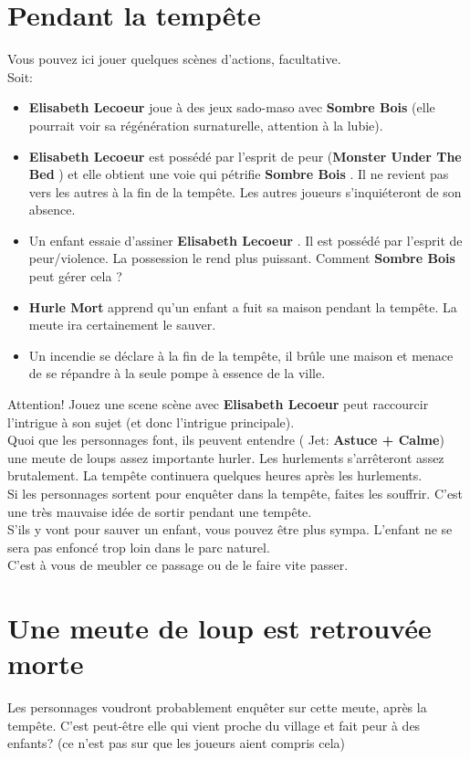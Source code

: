 \documentclass[oneside,12pt]{book}
\newcommand\roll[1]{
( Jet: \textbf{#1})
}
\newcommand{\Peter}{\textbf{Hurle Mort} }
\newcommand{\Leonard}{\textbf{Sombre Bois} }
\newcommand{\Monster}{\textbf{Monster Under The Bed} }
\newcommand{\Elisabeth}{\textbf{Elisabeth Lecoeur} }
\begin{document}
\begin{flushleft}
\section{Pendant la tempête}
Vous pouvez ici jouer quelques scènes d'actions, facultative.\\
Soit:\\ 
\begin{itemize}
\item  \Elisabeth joue à des jeux sado-maso avec \Leonard (elle pourrait voir sa régénération surnaturelle, attention à la lubie).
\item \Elisabeth est possédé par l'esprit de peur (\Monster) et elle obtient une voie qui pétrifie \Leonard. Il ne revient pas vers les autres à la fin de la tempête. Les autres joueurs s'inquiéteront de son absence.
\item Un enfant essaie d'assiner \Elisabeth . Il est possédé par l'esprit de peur/violence. La possession le rend plus puissant. Comment \Leonard peut gérer cela ?
\item \Peter apprend qu'un enfant a fuit sa maison pendant la tempête. La meute ira certainement le sauver.
\item Un incendie se déclare à la fin de la tempête, il brûle une maison et menace de se répandre à la seule pompe à essence de la ville. 
\end{itemize}
Attention! Jouez une scene scène avec \Elisabeth peut raccourcir l'intrigue à son sujet (et donc l'intrigue principale).\\

Quoi que les personnages font, ils peuvent entendre \roll{Astuce + Calme} une meute de loups assez importante hurler. 
Les hurlements s'arrêteront assez brutalement. La tempête continuera quelques heures après les hurlements. \\
Si les personnages sortent pour enquêter dans la tempête, faites les souffrir. 
C'est une très mauvaise idée de sortir pendant une tempête. \\
S'ils y vont pour sauver un enfant, vous pouvez être plus sympa. 
L'enfant ne se sera pas enfoncé trop loin dans le parc naturel.\\
C'est à vous de meubler ce passage ou de le faire vite passer.

\section{Une meute de loup est retrouvée morte}
\label{MeuteMorte}
Les personnages voudront probablement enquêter sur cette meute, après la tempête. 
C'est peut-être elle qui vient proche du village et fait peur à des enfants? 
(ce n'est pas sur que les joueurs aient compris cela) \\


\end{flushleft}
\end{document}
